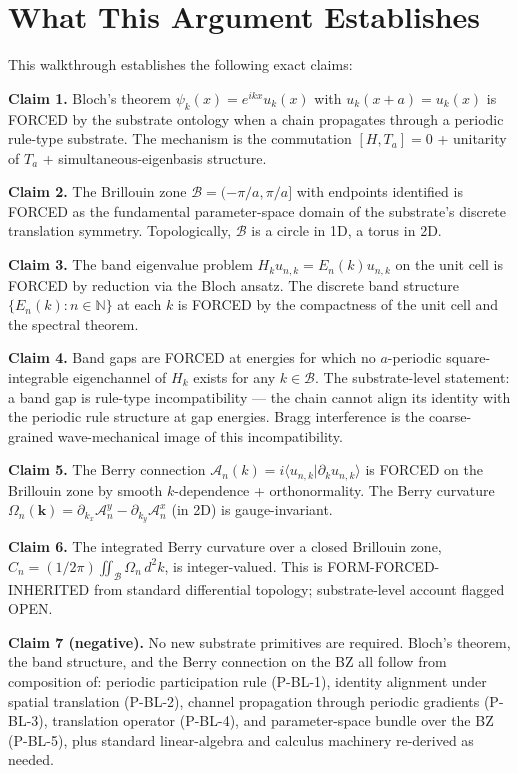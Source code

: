 \documentclass[11pt,a4paper]{article}
\begin{document}
\section{What This Argument Establishes}

This walkthrough establishes the following exact claims:

\textbf{Claim 1.} Bloch's theorem $\psi_k(x) = e^{ikx}u_k(x)$ with $u_k(x+a) = u_k(x)$ is FORCED by the substrate ontology when a chain propagates through a periodic rule-type substrate. The mechanism is the commutation $[H, T_a] = 0$ + unitarity of $T_a$ + simultaneous-eigenbasis structure.

\textbf{Claim 2.} The Brillouin zone $\mathcal{B} = (-\pi/a, \pi/a]$ with endpoints identified is FORCED as the fundamental parameter-space domain of the substrate's discrete translation symmetry. Topologically, $\mathcal{B}$ is a circle in 1D, a torus in 2D.

\textbf{Claim 3.} The band eigenvalue problem $H_k u_{n,k} = E_n(k)u_{n,k}$ on the unit cell is FORCED by reduction via the Bloch ansatz. The discrete band structure $\{E_n(k) : n \in \mathbb{N}\}$ at each $k$ is FORCED by the compactness of the unit cell and the spectral theorem.

\textbf{Claim 4.} Band gaps are FORCED at energies for which no $a$-periodic square-integrable eigenchannel of $H_k$ exists for any $k \in \mathcal{B}$. The substrate-level statement: a band gap is rule-type incompatibility --- the chain cannot align its identity with the periodic rule structure at gap energies. Bragg interference is the coarse-grained wave-mechanical image of this incompatibility.

\textbf{Claim 5.} The Berry connection $\mathcal{A}_n(k) = i\langle u_{n,k}|\partial_k u_{n,k}\rangle$ is FORCED on the Brillouin zone by smooth $k$-dependence + orthonormality. The Berry curvature $\Omega_n(\mathbf{k}) = \partial_{k_x}\mathcal{A}_n^y - \partial_{k_y}\mathcal{A}_n^x$ (in 2D) is gauge-invariant.

\textbf{Claim 6.} The integrated Berry curvature over a closed Brillouin zone, $C_n = (1/2\pi)\iint_\mathcal{B}\Omega_n\, d^2k$, is integer-valued. This is FORM-FORCED-INHERITED from standard differential topology; substrate-level account flagged OPEN.

\textbf{Claim 7 (negative).} No new substrate primitives are required. Bloch's theorem, the band structure, and the Berry connection on the BZ all follow from composition of: periodic participation rule (P-BL-1), identity alignment under spatial translation (P-BL-2), channel propagation through periodic gradients (P-BL-3), translation operator (P-BL-4), and parameter-space bundle over the BZ (P-BL-5), plus standard linear-algebra and calculus machinery re-derived as needed.
\end{document}
